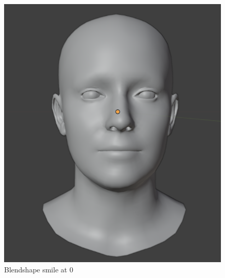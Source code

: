 \begin{subfigure}{0.33\linewidth}
  \includegraphics[width=\linewidth]{images/background_work/blendshapes_example/blendshapes_example_1.png}
  \caption{Blendshape smile at 0}
\end{subfigure}
\hfill
